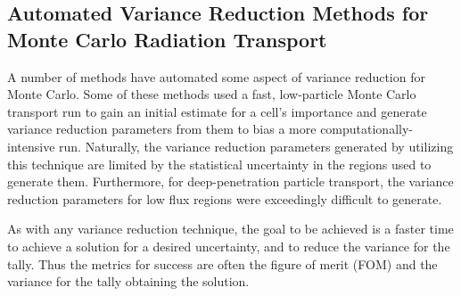 \subsection{Automated Variance Reduction Methods for Monte Carlo Radiation
Transport}
\label{subsec:AutomatedMCVR}

A number of methods have automated some aspect of variance
reduction for
Monte Carlo. Some of these methods used a fast, low-particle Monte Carlo
transport run to gain an initial estimate for a cell's importance and generate
variance reduction parameters from them to bias a more computationally-intensive
run. Naturally, the variance reduction parameters generated by utilizing this
technique are limited by the statistical uncertainty in the regions used to
generate them. Furthermore, for deep-penetration particle transport, the
variance reduction parameters for low flux regions were exceedingly difficult to
generate.

As with any variance reduction technique, the goal to be achieved is a faster
time to achieve a solution for a desired uncertainty, and to reduce the variance
for the tally.
Thus the metrics for success are often the figure of merit (FOM) and the
variance for the tally obtaining the solution.
